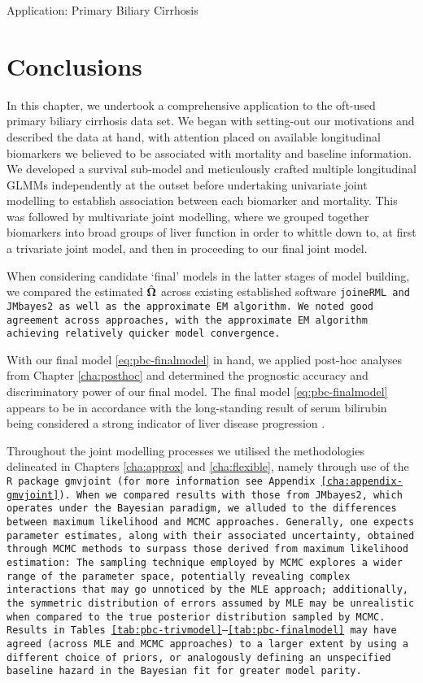 \begin{chapter}{\label{cha:app-PBC}Application: Primary Biliary Cirrhosis}
  \section{Conclusions}\label{sec:pbc-conclusions}
  In this chapter, we undertook a comprehensive application to the oft-used primary biliary cirrhosis data set. We began with setting-out our motivations and described the data at hand, with attention placed on available longitudinal biomarkers we believed to be associated with mortality and baseline information. We developed a survival sub-model and meticulously crafted multiple longitudinal GLMMs independently at the outset before undertaking univariate joint modelling to establish association between each biomarker and mortality. This was followed by multivariate joint modelling, where we grouped together biomarkers into broad groups of liver function in order to whittle down to, at first a trivariate joint model, and then in proceeding to our final joint model. 
  
  When considering candidate `final' models in the latter stages of model building, we compared the estimated $\hat{\bm{\Omega}}$ across existing established software \tt{joineRML} and \tt{JMbayes2} as well as the approximate EM algorithm. We noted good agreement across approaches, with the approximate EM algorithm achieving relatively quicker model convergence. 
  
  With our final model \eqref{eq:pbc-finalmodel} in hand, we applied post-hoc analyses from Chapter \ref{cha:posthoc} and determined the prognostic accuracy and discriminatory power of our final model. The final model \eqref{eq:pbc-finalmodel} appears to be in accordance with the long-standing result of serum bilirubin being considered a strong indicator of liver disease progression \citep{PBCarticle, Rizopoulos2012}.

  Throughout the joint modelling processes we utilised the methodologies delineated in Chapters \ref{cha:approx} and \ref{cha:flexible}, namely through use of the \tt{R} package \tt{gmvjoint} (for more information see Appendix \ref{cha:appendix-gmvjoint}). When we compared results with those from \tt{JMbayes2}, which operates under the Bayesian paradigm, we alluded to the differences between maximum likelihood and MCMC approaches. Generally, one expects parameter estimates, along with their associated uncertainty, obtained through MCMC methods to surpass those derived from maximum likelihood estimation: The sampling technique employed by MCMC explores a wider range of the parameter space, potentially revealing complex interactions that may go unnoticed by the MLE approach; additionally, the symmetric distribution of errors assumed by MLE may be unrealistic when compared to the true posterior distribution sampled by MCMC. Results in Tables \ref{tab:pbc-trivmodel}--\ref{tab:pbc-finalmodel} may have agreed (\ie across MLE and MCMC approaches) to a larger extent by \eg using a different choice of priors, or analogously defining an unspecified baseline hazard in the Bayesian fit for greater model parity.


\end{chapter}
